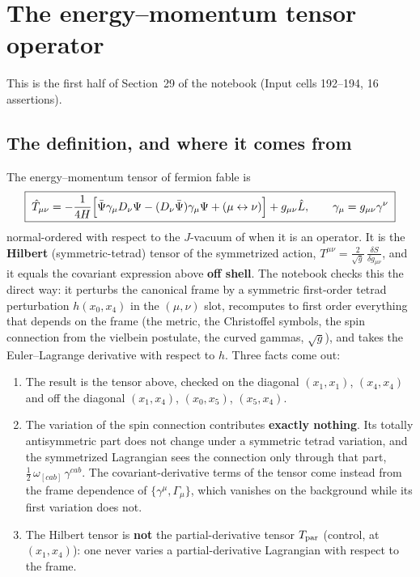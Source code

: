\section{The energy--momentum tensor operator}
\label{sec:7}

This is the first half of Section~29 of the notebook (Input cells 192--194, 16 assertions).

\subsection{The definition, and where it comes from}
\label{sec:7.1}

The energy--momentum tensor of fermion fable is
\[
  \boxed{\;\hat T_{\mu\nu}=-\frac{1}{4H}\Bigl[\bar\Psi\gamma_\mu D_\nu\Psi-(D_\nu\bar\Psi)\gamma_\mu\Psi+(\mu\leftrightarrow\nu)\Bigr]+g_{\mu\nu}\hat L,
  \qquad \gamma_\mu=g_{\mu\nu}\gamma^\nu\;}
\]
normal-ordered with respect to the $J$-vacuum of  when it is an operator. It is the
\textbf{Hilbert} (symmetric-tetrad) tensor of the symmetrized action,
$T^{\mu\nu}=\frac{2}{\sqrt g}\,\frac{\delta S}{\delta g_{\mu\nu}}$, and it equals the covariant
expression above \textbf{off shell}. The notebook checks this the direct way: it perturbs the
canonical frame by a symmetric first-order tetrad perturbation $h(x_0,x_4)$ in the $(\mu,\nu)$ slot,
recomputes to first order everything that depends on the frame (the metric, the Christoffel symbols,
the spin connection from the vielbein postulate, the curved gammas, $\sqrt g$), and takes the
Euler--Lagrange derivative with respect to $h$. Three facts come out:
\begin{enumerate}
  \item The result is the tensor above, checked on the diagonal $(x_1,x_1)$, $(x_4,x_4)$ and off the
        diagonal $(x_1,x_4)$, $(x_0,x_5)$, $(x_5,x_4)$.
  \item The variation of the spin connection contributes \textbf{exactly nothing}. Its totally
        antisymmetric part does not change under a symmetric tetrad variation, and the symmetrized
        Lagrangian sees the connection only through that part, $\tfrac12\,\omega_{[cab]}\,\gamma^{cab}$.
        The covariant-derivative terms of the tensor come instead from the frame dependence of
        $\{\gamma^\mu,\Gamma_\mu\}$, which vanishes on the background while its first variation does
        not.
  \item The Hilbert tensor is \textbf{not} the partial-derivative tensor $T_{\mathrm{par}}$ (control, at
        $(x_1,x_4)$): one never varies a partial-derivative Lagrangian with respect to the frame.
\end{enumerate}
